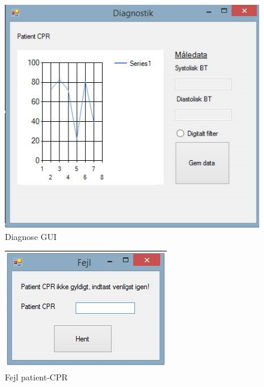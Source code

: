 \begin{figure}[H]
\centering
\includegraphics[scale=0.80]{dia.PNG}
\caption{Diagnose GUI}
\end{figure}

\begin{figure}[H]
\centering
\includegraphics[scale=0.90]{fejl.PNG}
\caption{Fejl patient-CPR}
\end{figure}